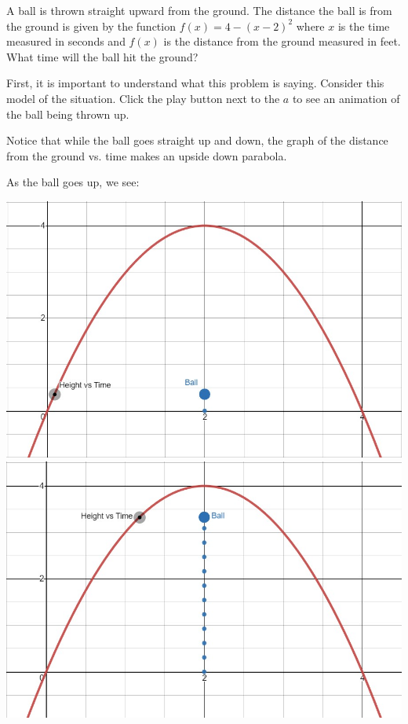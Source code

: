 \documentclass[nooutcomes]{ximera}
\begin{document}
\begin{example}
A ball is thrown straight upward from the ground.  The distance the ball is from the ground is given by the function $f(x)=4-(x-2)^2$ where $x$ is the time measured in seconds and $f(x)$ is the distance from the ground measured in feet.  What time will the ball hit the ground?

\begin{explanation}
First, it is important to understand what this problem is saying.  Consider this model of the situation.  Click the play button next to the $a$ to see an animation of the ball being thrown up.

\begin{center}  
\end{center}

Notice that while the ball goes straight up and down, the graph of the distance from the ground vs. time makes an upside down parabola.  

As the ball goes up, we see:
\begin{image}
\includegraphics[width=.8\textwidth]{Zeros-BouncingBall1}
\includegraphics[width=.8\textwidth]{Zeros-BouncingBall3}
\end{image}



\end{explanation}
\end{example}
\end{document}
